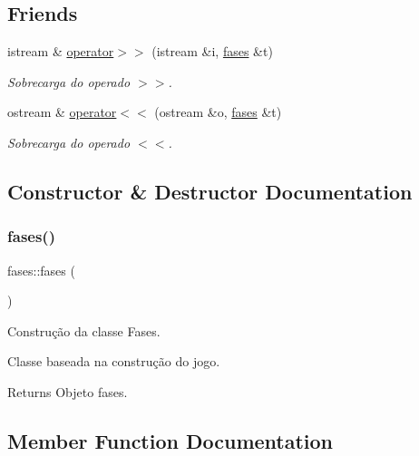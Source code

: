 \subsection*{Friends}
\begin{DoxyCompactItemize}
\item 
istream \& \mbox{\hyperlink{classfases_a24bc7622c7828e59917da245c41920d8}{operator$>$$>$}} (istream \&i, \mbox{\hyperlink{classfases}{fases}} \&t)
\begin{DoxyCompactList}\small\item\em Sobrecarga do operado $>$$>$. \end{DoxyCompactList}\item 
ostream \& \mbox{\hyperlink{classfases_a918b9b50f8716407ea46bdfbf5848271}{operator$<$$<$}} (ostream \&o, \mbox{\hyperlink{classfases}{fases}} \&t)
\begin{DoxyCompactList}\small\item\em Sobrecarga do operado $<$$<$. \end{DoxyCompactList}\end{DoxyCompactItemize}


\subsection{Constructor \& Destructor Documentation}
\mbox{\label{classfases_a39d5b42a40a958d25411c51cb2b0959c}} 
\subsubsection{\texorpdfstring{fases()}{fases()}}
{\footnotesize\ttfamily fases\+::fases (\begin{DoxyParamCaption}{ }\end{DoxyParamCaption})}



Construção da classe Fases. 

Classe baseada na construção do jogo. \begin{DoxyReturn}{Returns}
Objeto fases. 
\end{DoxyReturn}


\subsection{Member Function Documentation}
\mbox{\label{classfases_aa05ea0c25d2c70ee022f56f02003b4b5}} 
